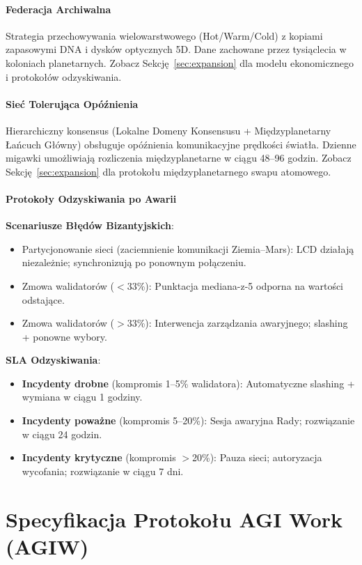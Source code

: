 \documentclass[11pt]{article}
\begin{document}
\paragraph{Federacja Archiwalna}
Strategia przechowywania wielowarstwowego (Hot/Warm/Cold) z kopiami zapasowymi DNA i dysków optycznych 5D. Dane zachowane przez tysiąclecia w koloniach planetarnych. Zobacz Sekcję~\ref{sec:expansion} dla modelu ekonomicznego i protokołów odzyskiwania.

\paragraph{Sieć Tolerująca Opóźnienia}
Hierarchiczny konsensus (Lokalne Domeny Konsensusu + Międzyplanetarny Łańcuch Główny) obsługuje opóźnienia komunikacyjne prędkości światła. Dzienne migawki umożliwiają rozliczenia międzyplanetarne w ciągu 48--96 godzin. Zobacz Sekcję~\ref{sec:expansion} dla protokołu międzyplanetarnego swapu atomowego.

\paragraph{Protokoły Odzyskiwania po Awarii}
\textbf{Scenariusze Błędów Bizantyjskich}:
\begin{itemize}[noitemsep]
  \item Partycjonowanie sieci (zaciemnienie komunikacji Ziemia--Mars): LCD działają niezależnie; synchronizują po ponownym połączeniu.
  \item Zmowa walidatorów ($<$33\%): Punktacja mediana-z-5 odporna na wartości odstające.
  \item Zmowa walidatorów ($>$33\%): Interwencja zarządzania awaryjnego; slashing + ponowne wybory.
\end{itemize}

\textbf{SLA Odzyskiwania}:
\begin{itemize}[noitemsep]
  \item \textbf{Incydenty drobne} (kompromis 1--5\% walidatora): Automatyczne slashing + wymiana w ciągu 1 godziny.
  \item \textbf{Incydenty poważne} (kompromis 5--20\%): Sesja awaryjna Rady; rozwiązanie w ciągu 24 godzin.
  \item \textbf{Incydenty krytyczne} (kompromis $>$20\%): Pauza sieci; autoryzacja wycofania; rozwiązanie w ciągu 7 dni.
\end{itemize}

\section{Specyfikacja Protokołu AGI Work (AGIW)}
\label{sec:agiw-spec}
\end{document}
